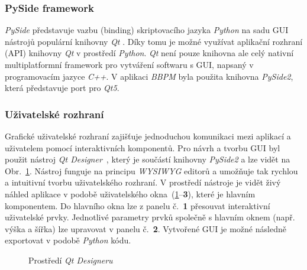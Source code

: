 \subsubsection{PySide framework}
\label{section:pyside}
\textit{PySide} představuje vazbu (binding) skriptovacího jazyka \textit{Python}
na sadu GUI nástrojů populární knihovny \textit{Qt} \cite{Qt}. Díky tomu je
možné využívat aplikační rozhraní (API) knihovny \textit{Qt} v prostředí
\textit{Python}. \textit{Qt} není pouze knihovna ale celý nativní
multiplatformní framework pro vytváření softwaru s GUI, napsaný v programovacím
jazyce \textit{C++}. V aplikaci \textit{BBPM} byla použita knihovna
\textit{PySide2}, která představuje port pro \textit{Qt5}.

\subsubsection{Uživatelské rozhraní}
\label{section:gui}
Grafické uživatelské rozhraní zajišťuje jednoduchou komunikaci mezi aplikací a
uživatelem pomocí interaktivních komponentů. Pro návrh a tvorbu GUI byl použit
nástroj \textit{Qt Designer}~\cite{QtDesigner}, který je součástí knihovny
\textit{PySide2} a lze vidět na Obr.~\ref{fig:qt_designer}. Nástroj funguje na
principu \textit{WYSIWYG} editorů a umožňuje tak rychlou a intuitivní tvorbu
uživatelského rozhraní. V prostředí nástroje je vidět živý náhled aplikace v
podobě uživatelského okna~(\ref{fig:qt_designer}--\textbf{3}), které je hlavním
komponentem. Do hlavního okna lze z panelu č.~\textbf{1} přesouvat interaktivní
uživatelské prvky. Jednotlivé parametry prvků společně s hlavním oknem (např.
výška a šířka) lze upravovat v panelu č.~\textbf{2}. Vytvořené GUI je možné
následně exportovat v podobě \textit{Python} kódu.

\begin{figure}[h]
    \begin{center}
        \textcolor{black}{\fboxrule=0.5pt\fboxsep=0pt}
        \caption{Prostředí \textit{Qt Designeru}}
        \label{fig:qt_designer}
    \end{center}
\end{figure}

